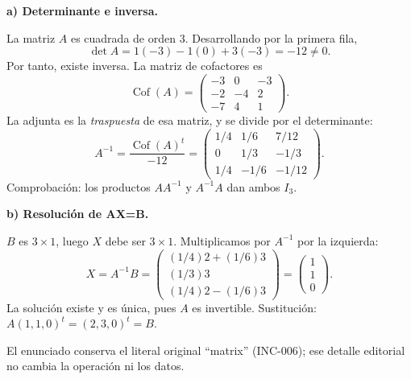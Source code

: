 \textbf{a) Determinante e inversa.}\par\nopagebreak[4]
La matriz $A$ es cuadrada de orden 3. Desarrollando por la primera fila,
\[
\det A=1(-3)-1(0)+3(-3)=-12\ne0.
\]
Por tanto, existe inversa. La matriz de cofactores es
\[
\operatorname{Cof}(A)=\begin{pmatrix}-3&0&-3\\-2&-4&2\\-7&4&1\end{pmatrix}.
\]
La adjunta es la \emph{traspuesta} de esa matriz, y se divide por el determinante:
\[
\boxed{A^{-1}=\frac{\operatorname{Cof}(A)^t}{-12}
=\begin{pmatrix}1/4&1/6&7/12\\0&1/3&-1/3\\1/4&-1/6&-1/12\end{pmatrix}.}
\]
Comprobación: los productos $AA^{-1}$ y $A^{-1}A$ dan ambos $I_3$.

\textbf{b) Resolución de AX=B.}\par\nopagebreak[4]
$B$ es $3\times1$, luego $X$ debe ser $3\times1$. Multiplicamos por $A^{-1}$ por la izquierda:
\[
X=A^{-1}B=
\begin{pmatrix}(1/4)2+(1/6)3\\(1/3)3\\(1/4)2-(1/6)3\end{pmatrix}
=\boxed{\begin{pmatrix}1\\1\\0\end{pmatrix}.}
\]
La solución existe y es única, pues $A$ es invertible. Sustitución: $A(1,1,0)^t=(2,3,0)^t=B$.

El enunciado conserva el literal original ``matrix'' (INC-006); ese detalle editorial no cambia la operación ni los datos.
